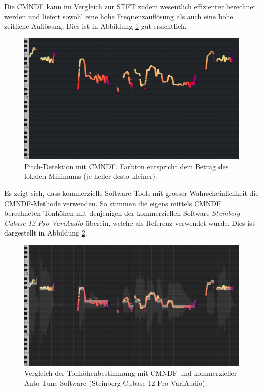 Die CMNDF kann im Vergleich zur STFT zudem wesentlich effizienter berechnet werden und liefert sowohl eine hohe Frequenzauflösung als auch eine hohe zeitliche Auflösung.
Dies ist in Abbildung \ref{autotune:fig:pitchDetektionCMNDF} gut ersichtlich.
\begin{figure}
	\centering
	\includegraphics[width=\textwidth]{papers/autotune/images/Pianoscale_Example_Detuned_CMNDF.png}
	\caption{Pitch-Detektion mit CMNDF. Farbton entspricht dem Betrag des lokalen Minimums (je heller desto kleiner).}
    \label{autotune:fig:pitchDetektionCMNDF}
\end{figure}

Es zeigt sich, dass kommerzielle Software-Tools mit grosser Wahrscheinlichkeit die CMNDF-Methode verwenden.
So stimmen die eigens mittels CMNDF berechneten Tonhöhen mit denjenigen der kommerziellen Software \emph{Steinberg Cubase 12 Pro VariAudio} überein,
welche als Referenz verwendet wurde. Dies ist dargestellt in Abbildung \ref{autotune:fig:pitchDetektionCMNDFReference}.
\begin{figure}
	\centering
	\includegraphics[width=\textwidth]{papers/autotune/images/Pianoscale_Example_Detuned_CMNDF_Reference.png}
	\caption{Vergleich der Tonhöhenbestimmung mit CMNDF und kommerzieller Auto-Tune Software (Steinberg Cubase 12 Pro VariAudio).}
    \label{autotune:fig:pitchDetektionCMNDFReference}
\end{figure}
